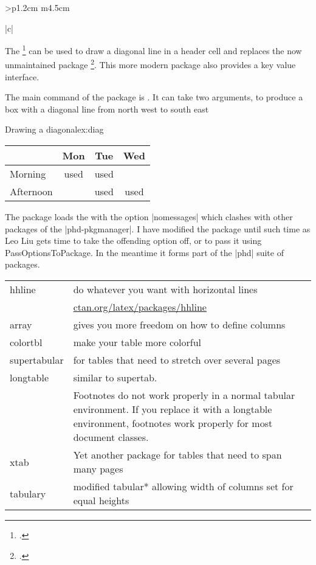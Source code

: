 \begin{tabular}{>{\bfseries}p{1.2cm} m{4.5cm}}
\begin{tabular}[t]{|c|}
\begin{longtable}
The \footcite{diagbox} can be used to draw a diagonal line in a header cell and replaces the now unmaintained package \footcite[][The package has an example file and no detailed documentation. As its licence is not LLP it is also not loaded automatically by texlive.]{slashbox}. This more modern package also
provides a key value interface. 


The main command of the package is . It can take two arguments, to produce a box with a diagonal line from north west to south east

\begin{texexample}{Drawing a diagonal}{ex:diag}
\begin{tabular}{|l|ccc|}
 \hline
 \diagbox{Time}{Day} & Mon & Tue & Wed \\
 \hline
 Morning & used & used & \\
 Afternoon & & used & used \\
 \hline
\end{tabular}
\end{texexample}

The package loads the  with the option |nomessages| which clashes with other
packages of the |phd-pkgmanager|. I have modified the package until such time as Leo Liu gets
time to take the offending option off, or to pass it using PassOptionsToPackage. In the
meantime it forms part of the |phd| suite of packages.


\begin{longtable}{lp{7cm}}
\toprule
hhline &do whatever you want with horizontal lines\\
       &\url{ctan.org/latex/packages/hhline}\\

array &gives you more freedom on how to define columns\\
colortbl &make your table more colorful\\
supertabular &for tables that need to stretch over several pages\\
longtable &similar to supertab.\\
          &\small Footnotes do not work properly in a normal tabular environment. If you replace it with a longtable environment, footnotes work properly for most document classes.\\

xtab &Yet another package for tables that need to span many pages\\

tabulary &modified tabular* allowing width of columns set for equal heights\\


\end{longtable}
\end{longtable}
\end{tabular}
\end{tabular}
